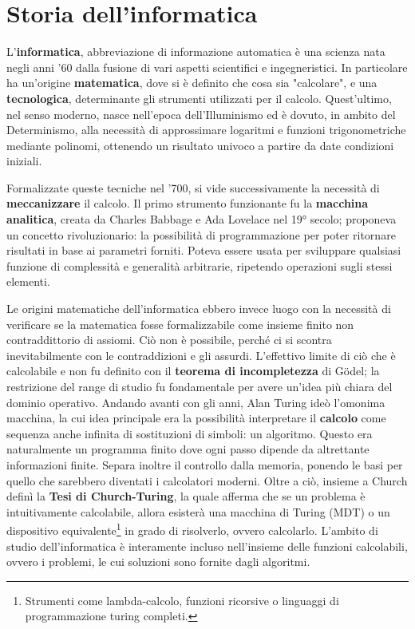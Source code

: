 \section{Storia dell'informatica}
L'\textbf{informatica}, abbreviazione di informazione automatica è una scienza nata negli anni '60 dalla fusione di vari aspetti scientifici e
ingegneristici. In particolare ha un'origine \textbf{matematica}, dove si è definito che cosa sia "calcolare", e una \textbf{tecnologica}, determinante
gli strumenti utilizzati per il calcolo. Quest'ultimo, nel senso moderno, nasce nell'epoca dell'Illuminismo ed è dovuto, in ambito del Determinismo,
alla necessità di approssimare logaritmi e funzioni trigonometriche mediante polinomi, ottenendo un risultato univoco a partire da date condizioni
iniziali.\par
Formalizzate queste tecniche nel '700, si vide successivamente la necessità di \textbf{meccanizzare} il calcolo. Il primo strumento funzionante fu la
\textbf{macchina analitica}, creata da Charles Babbage e Ada Lovelace nel 19° secolo; proponeva un concetto rivoluzionario: la possibilità di
programmazione per poter ritornare risultati in base ai parametri forniti. Poteva essere usata per sviluppare qualsiasi funzione di complessità e
generalità arbitrarie, ripetendo operazioni sugli stessi elementi.\par
Le origini matematiche dell'informatica ebbero invece luogo con la necessità di verificare se la matematica fosse formalizzabile come insieme finito non
contraddittorio di assiomi. Ciò non è possibile, perché ci si scontra inevitabilmente con le contraddizioni e gli assurdi. L'effettivo limite di ciò
che è calcolabile e non fu definito con il \textbf{teorema di incompletezza} di Gödel; la restrizione del range di studio fu fondamentale per avere
un'idea più chiara del dominio operativo. Andando avanti con gli anni, Alan Turing ideò l'omonima macchina, la cui idea principale era la possibilità
interpretare il \textbf{calcolo} come sequenza anche infinita di sostituzioni di simboli: un algoritmo. Questo era naturalmente un programma finito dove
ogni passo dipende da altrettante informazioni finite. Separa inoltre il controllo dalla memoria, ponendo le basi per quello che sarebbero diventati
i calcolatori moderni. Oltre a ciò, insieme a Church definì la \textbf{Tesi di Church-Turing}, la quale afferma che se un problema è intuitivamente
calcolabile, allora esisterà una macchina di Turing (MDT) o un dispositivo equivalente\footnote{Strumenti come lambda-calcolo, funzioni ricorsive o
linguaggi di programmazione turing completi.} in grado di risolverlo, ovvero calcolarlo. L'ambito di studio dell'informatica è interamente incluso
nell'insieme delle funzioni calcolabili, ovvero i problemi, le cui soluzioni sono fornite dagli algoritmi.

